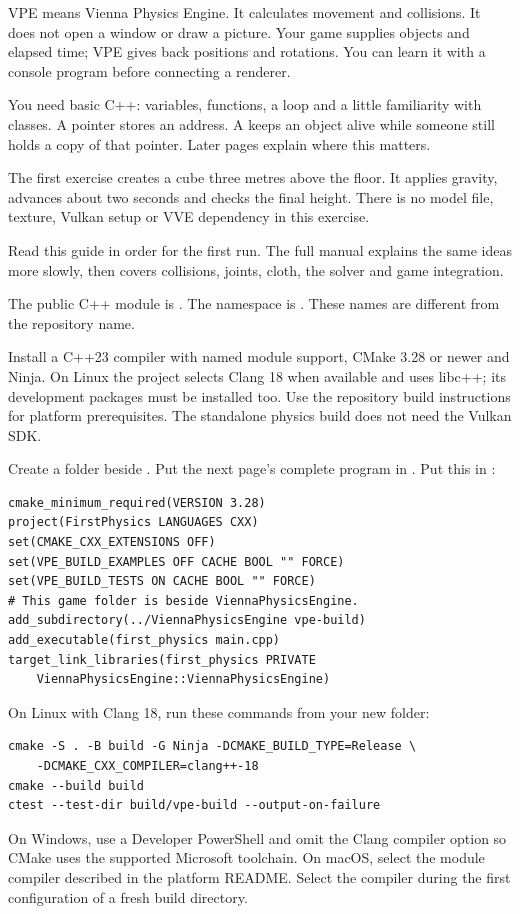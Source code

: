 \documentclass[11pt,a4paper]{article}
\begin{document}
\tableofcontents
{}
VPE means Vienna Physics Engine. It calculates movement and collisions. It does not open a window or draw a picture. Your game supplies objects and elapsed time; VPE gives back positions and rotations. You can learn it with a console program before connecting a renderer.

You need basic C++: variables, functions, a loop and a little familiarity with classes. A pointer stores an address. A  keeps an object alive while someone still holds a copy of that pointer. Later pages explain where this matters.

The first exercise creates a cube three metres above the floor. It applies gravity, advances about two seconds and checks the final height. There is no model file, texture, Vulkan setup or VVE dependency in this exercise.

Read this guide in order for the first run. The full manual explains the same ideas more slowly, then covers collisions, joints, cloth, the solver and game integration.

\begin{remember}The public C++ module is . The namespace is . These names are different from the repository name.\end{remember}
Install a C++23 compiler with named module support, CMake 3.28 or newer and Ninja. On Linux the project selects Clang 18 when available and uses libc++; its development packages must be installed too. Use the repository build instructions for platform prerequisites. The standalone physics build does not need the Vulkan SDK.

Create a folder beside . Put the next page's complete program in . Put this in :\begin{lstlisting}
cmake_minimum_required(VERSION 3.28)
project(FirstPhysics LANGUAGES CXX)
set(CMAKE_CXX_EXTENSIONS OFF)
set(VPE_BUILD_EXAMPLES OFF CACHE BOOL "" FORCE)
set(VPE_BUILD_TESTS ON CACHE BOOL "" FORCE)
# This game folder is beside ViennaPhysicsEngine.
add_subdirectory(../ViennaPhysicsEngine vpe-build)
add_executable(first_physics main.cpp)
target_link_libraries(first_physics PRIVATE
    ViennaPhysicsEngine::ViennaPhysicsEngine)
\end{lstlisting}
On Linux with Clang 18, run these commands from your new folder:\begin{lstlisting}
cmake -S . -B build -G Ninja -DCMAKE_BUILD_TYPE=Release \
    -DCMAKE_CXX_COMPILER=clang++-18
cmake --build build
ctest --test-dir build/vpe-build --output-on-failure
\end{lstlisting}
On Windows, use a Developer PowerShell and omit the Clang compiler option so CMake uses the supported Microsoft toolchain. On macOS, select the module compiler described in the platform README. Select the compiler during the first configuration of a fresh build directory.
\end{document}
